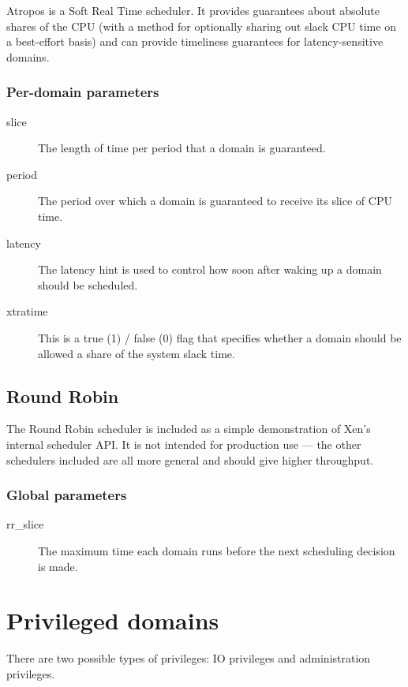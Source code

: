 \documentclass[11pt,twoside,final,openright]{xenstyle}
\begin{document}
{Atropos is a Soft Real Time scheduler.  It provides guarantees about
absolute shares of the CPU (with a method for optionally sharing out
slack CPU time on a best-effort basis) and can provide timeliness
guarantees for latency-sensitive domains.

\subsection{Per-domain parameters}

\begin{description}
\item[slice]
  The length of time per period that a domain is guaranteed.
\item[period]
  The period over which a domain is guaranteed to receive
  its slice of CPU time.
\item[latency]
  The latency hint is used to control how soon after
  waking up a domain should be scheduled.
\item[xtratime]
  This is a true (1) / false (0) flag that specifies whether
  a domain should be allowed a share of the system slack time.
\end{description}

\section{Round Robin}

The Round Robin scheduler is included as a simple demonstration of
Xen's internal scheduler API.  It is not intended for production use
--- the other schedulers included are all more general and should give
higher throughput.

\subsection{Global parameters}

\begin{description}
\item[rr\_slice]
  The maximum time each domain runs before the next
  scheduling decision is made.
\end{description}

\chapter{Privileged domains}

There are two possible types of privileges: IO privileges and
administration privileges.

}
\end{document}
